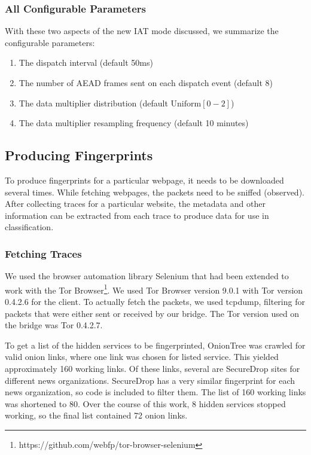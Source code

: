 \documentclass[11pt]{article}
\begin{document}
\subsubsection{All Configurable Parameters}
With these two aspects of the new IAT mode discussed, we summarize the configurable parameters:
\begin{enumerate}
    \item The dispatch interval (default 50ms)
    \item The number of AEAD frames sent on each dispatch event (default 8)
    \item The data multiplier distribution (default $\text{Uniform}[0-2]$)
    \item The data multiplier resampling frequency (default 10 minutes)
\end{enumerate}

\subsection{Producing Fingerprints}
To produce fingerprints for a particular webpage, it needs to be downloaded several times. While fetching webpages, the packets need to be sniffed (observed). After collecting traces for a particular website, the metadata and other information can be extracted from each trace to produce data for use in classification.
\subsubsection{Fetching Traces}
We used the browser automation library Selenium that had been extended to work with the Tor Browser\footnote{https://github.com/webfp/tor-browser-selenium}. We used Tor Browser version 9.0.1 with Tor version 0.4.2.6 for the client. To actually fetch the packets, we used tcpdump, filtering for packets that were either sent or received by our bridge. The Tor version used on the bridge was Tor 0.4.2.7.

To get a list of the hidden services to be fingerprinted, OnionTree was crawled for valid onion links, where one link was chosen for listed service. This yielded approximately 160 working links. Of these links, several are SecureDrop sites for different news organizations. SecureDrop has a very similar fingerprint for each news organization, so code is included to filter them. The list of 160 working links was shortened to 80. Over the course of this work, 8 hidden services stopped working, so the final list contained 72 onion links.
\end{document}
